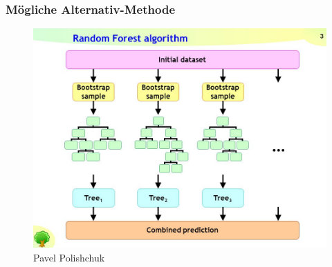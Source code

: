 \documentclass[aspectratio=1610, professionalfonts, 9pt]{beamer}
\begin{document}
  \begin{frame}
    \frametitle{Mögliche Alternativ-Methode}
    \begin{figure}
          \includegraphics[width=\textwidth]{pictures/RF.jpg}
          \caption{Pavel Polishchuk}
          \label{}
      \end{figure}
  \end{frame}

  \begin{frame}
    \printbibliography
  \end{frame}
\end{document}

